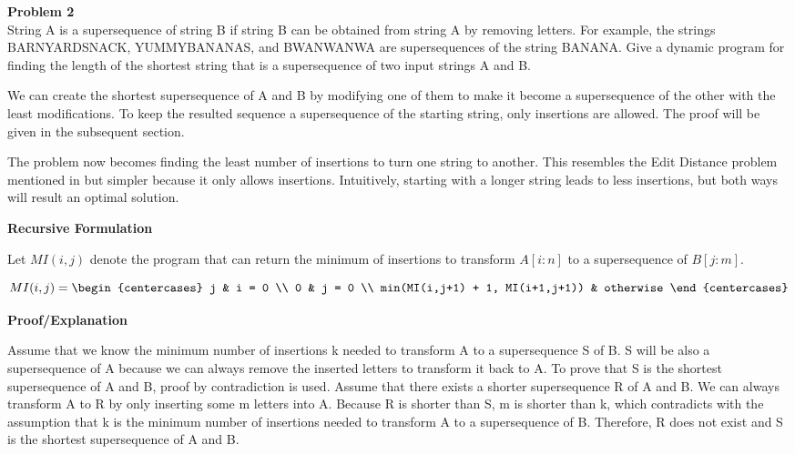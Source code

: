 \documentclass[12pt,article]{article}
\newenvironment{problem}[2][Problem]
    { \begin{mdframed}[backgroundcolor=gray!20] \textbf{#1 #2} \\}
    {  \end{mdframed}}
\begin{document}
\newpage
\begin{problem}{2} 
String A is a supersequence of string B if string B can be obtained from string A by removing letters. For example, the strings BARNYARDSNACK, YUMMYBANANAS, and BWANWANWA are supersequences of the string BANANA. Give a dynamic program for finding the length of the shortest string that is a supersequence of two input strings A and B.
\end{problem}

We can create the shortest supersequence of A and B by modifying one of them to make it become a supersequence of the other with the least modifications. To keep the resulted sequence a supersequence of the starting string, only insertions are allowed. The proof will be given in the subsequent section. 

The problem now becomes finding the least number of insertions to turn one string to another. This resembles the Edit Distance problem mentioned in \cite{JeffE19} but simpler because it only allows insertions. Intuitively, starting with a longer string leads to less insertions, but both ways will result an optimal solution.

\textbf{Recursive Formulation}

Let $MI(i,j)$ denote the program that can return the minimum of insertions to transform $A[i:n]$ to a supersequence of $B[j:m]$. 

\normalsize{
    \[
        MI(i,j)=
        \begin{centercases}
            j   & i = 0 \\
            0   & j = 0 \\
            min(MI(i,j+1) + 1, MI(i+1,j+1)) & otherwise
        \end{centercases}
        \]
}

\textbf{Proof/Explanation}

Assume that we know the minimum number of insertions k needed to transform A to a supersequence S of B. S will be also a supersequence of A because we can always remove the inserted letters to transform it back to A. To prove that S is the shortest supersequence of A and B, proof by contradiction is used. Assume that there exists a shorter supersequence R of A and B. We can always transform A to R by only inserting some m letters into A. Because R is shorter than S, m is shorter than k, which contradicts with the assumption that k is the minimum number of insertions needed to transform A to a supersequence of B. Therefore, R does not exist and S is the shortest supersequence of A and B.
\end{document}

